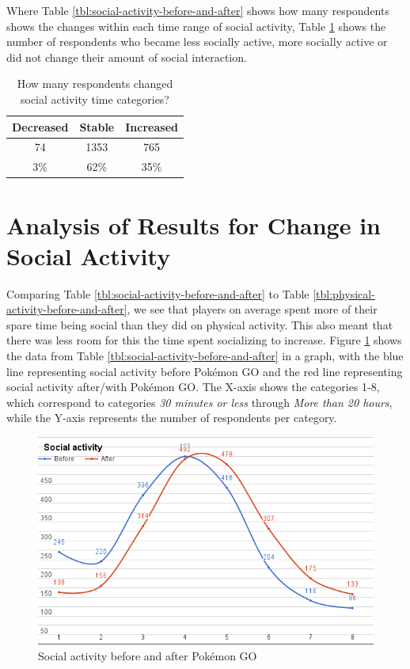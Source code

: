 Where Table \ref{tbl:social-activity-before-and-after} shows how many respondents shows the changes within each time range of social activity, Table \ref{tbl:social-activity-change-or-stable} shows the number of respondents who became less socially active, more socially active or did not change their amount of social interaction.

\begin{table}[h]
	\centering
	\caption{How many respondents changed social activity time categories?}
	\label{tbl:social-activity-change-or-stable}
	\begin{tabular}{|c|c|c|}
		\hline
		\textbf{Decreased} & \textbf{Stable} & \textbf{Increased}\\\hline\hline
		74		& 1353		& 765\\
		3\%		& 62\%		& 35\%\\\hline
	\end{tabular}
\end{table}

\section{Analysis of Results for Change in Social Activity}

Comparing Table \ref{tbl:social-activity-before-and-after} to Table \ref{tbl:physical-activity-before-and-after}, we see that players on average spent more of their spare time being social than they did on physical activity. This also meant that there was less room for this the time spent socializing to increase. Figure \ref{fig:social-activity-graph} shows the data from Table \ref{tbl:social-activity-before-and-after} in a graph, with the blue line representing social activity before Pokémon GO and the red line representing social activity after/with Pokémon GO. The X-axis shows the categories 1-8, which correspond to categories \emph{30 minutes or less} through \emph{More than 20 hours}, while the Y-axis represents the number of respondents per category.

\begin{figure}[h]
	\centering
	\includegraphics[width=\textwidth]{Figures/social-activity-graph-2}
	\caption{Social activity before and after Pokémon GO}
	\label{fig:social-activity-graph}
\end{figure}

